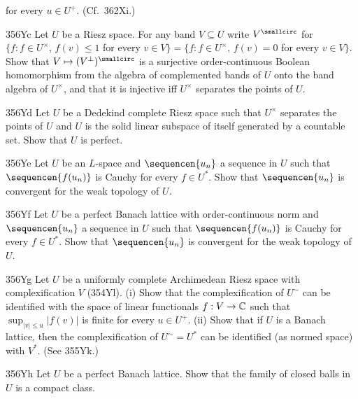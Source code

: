{

\noindent for every $u\in U^+$.   (Cf.\ 362Xi.)

\spheader 356Yc Let $U$ be a Riesz space.   For any band $V\subseteq U$
write $V^{\smallcirc}$ for
$\{f:f\in U^{\times}$, $f(v)\le 1$ for every $v\in V\}
=\{f:f\in U^{\times},\,f(v)=0$ for every $v\in V\}$.
Show that $V\mapsto (V^{\perp})^{\smallcirc}$ is a surjective
order-continuous
Boolean homomorphism from the algebra of complemented bands of $U$ onto
the band algebra of $U^{\times}$, and that it is injective iff
$U^{\times}$ separates the points of $U$.

\spheader 356Yd Let $U$ be a Dedekind complete Riesz space such that
$U^{\times}$ separates the points of $U$ and $U$ is the solid linear
subspace of itself generated by a countable set.   Show that $U$ is
perfect.

\spheader 356Ye  Let $U$ be an $L$-space and
$\sequencen{u_n}$ a sequence in $U$ such that $\sequencen{f(u_n)}$ is
Cauchy for every $f\in U^*$.   Show that $\sequencen{u_n}$ is convergent
for the weak topology of $U$.   

\spheader 356Yf  Let $U$ be a perfect Banach lattice with
order-continuous norm and
$\sequencen{u_n}$ a sequence in $U$ such that $\sequencen{f(u_n)}$ is
Cauchy for every $f\in U^*$.   Show that $\sequencen{u_n}$ is convergent
for the weak topology of $U$.   

\spheader 356Yg Let $U$ be a uniformly complete Archimedean Riesz space
with complexification $V$ (354Yl).   (i) Show that the complexification
of $U^{\sim}$ can be identified with the space of linear functionals
$f:V\to\Bbb C$ such that $\sup_{|v|\le u}|f(v)|$ is finite for every
$u\in U^+$.   (ii) Show that if $U$ is a Banach lattice, then the
complexification of $U^{\sim}=U^*$ can be identified (as normed space)
with $V^*$.   (See 355Yk.)

\spheader 356Yh Let $U$ be a perfect Banach lattice.
Show that the family of closed balls in $U$ is a compact class.
}%

